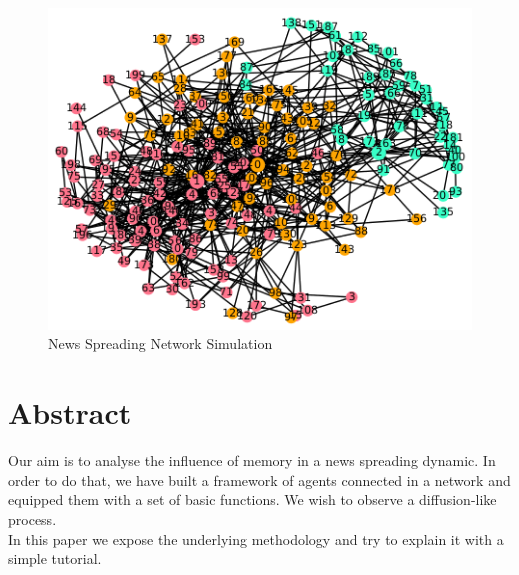 \begin{figure}[!h]
  \centering
  \includegraphics[trim={2.1cm 2cm 2cm 2cm}, clip, width=\columnwidth]{img/png/cover.png}
  \caption{News Spreading Network Simulation\protect\footnotemark}
  \label{fig:abstract}
\end{figure}
\section*{Abstract}\label{abstract}
Our aim is to analyse the influence of memory in a news spreading dynamic.
In order to do that, we have built a framework of agents connected in a
network and equipped them with a set of basic functions. We wish to
observe a diffusion-like process.\\
In this paper we expose the underlying
methodology and try to explain it with a simple tutorial.

